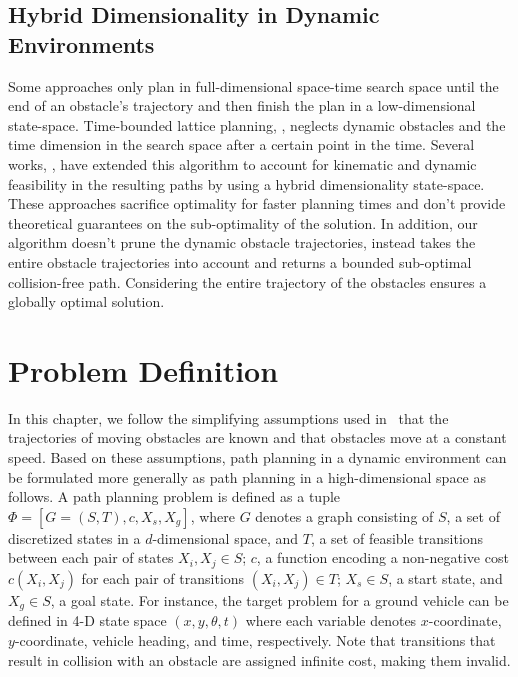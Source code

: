 \subsection{Hybrid Dimensionality in Dynamic Environments}
Some approaches only plan in full-dimensional space-time search space until the end of an obstacle's trajectory and then finish the plan in a low-dimensional state-space. Time-bounded lattice planning, \cite{kushleyev2009time}, neglects dynamic obstacles and the time dimension in the search space after a certain point in the time. Several works, \cite{petereit2013mobile,petereit2014combined}, have extended this algorithm to account for kinematic and dynamic feasibility in the resulting paths by using a hybrid dimensionality state-space. These approaches sacrifice optimality for faster planning times and don't provide theoretical guarantees on the sub-optimality of the solution. In addition, our algorithm doesn't prune the dynamic obstacle trajectories, instead takes the entire obstacle trajectories into account and returns a bounded sub-optimal collision-free path. Considering the entire trajectory of the obstacles ensures a globally optimal solution.

\section{Problem Definition}\label{sec:ppad-problem}

In this chapter, we follow the simplifying assumptions used in~\cite{phillips2011sipp} that the trajectories of moving obstacles are known and that obstacles move at a constant speed. Based on these assumptions, path planning in a dynamic environment can be formulated more generally as path planning in a high-dimensional space as follows. A path planning problem is defined as a tuple $\Phi = [G = (S, T), c, X_{s}, X_{g}]$, where $G$ denotes a graph consisting of $S$, a set of discretized states in a $d$-dimensional space, and $T$, a set of feasible transitions between each pair of states $X_i, X_j \in S$; $c$, a function encoding a non-negative cost $c(X_i,X_j)$ for each pair of transitions $(X_i,X_j) \in T$; $X_{s} \in S$, a start state, and $X_{g} \in S$, a goal state. For instance, the target problem for a ground vehicle can be defined in 4-D state space $(x, y, \theta, t)$ where each variable denotes $x$-coordinate, $y$-coordinate, vehicle heading, and time, respectively. Note that transitions that result in collision with an obstacle are assigned infinite cost, making them invalid. 

